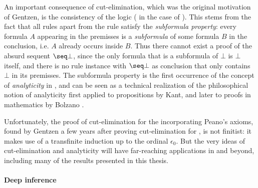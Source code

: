 An important consequence of cut-elimination, which was the original motivation
of Gentzen, is the consistency of the logic (  in
the case of ). This stems from the fact that all rules apart from the
 rule satisfy the \emph{subformula property}: every formula $A$
appearing in the premisses is a \emph{subformula} of some formula $B$ in the
conclusion, i.e. $A$ already occurs inside $B$. Thus there cannot exist a proof
of the absurd sequent $\seq \bot$, since the only formula that is a subformula
of $\bot$ is $\bot$ itself, and there is no rule instance with $\seq \bot$ as
conclusion that only contains $\bot$ in its premisses. The subformula property
is the first occurrence of the concept of \emph{analyticity} in ,
and can be seen as a technical realization of the philosophical notion of
analyticity first applied to propositions by Kant, and later to proofs in
mathematics by Bolzano .

Unfortunately, the proof of cut-elimination for the 
incorporating Peano's axioms, found by Gentzen a few years after proving
cut-elimination for  , is
not finitist: it makes use of a transfinite induction up to the ordinal
$\epsilon_0$. But the very ideas of cut-elimination and analyticity will have
far-reaching applications in  and beyond, including many of the
results presented in this thesis.

\paragraph{Deep inference}

